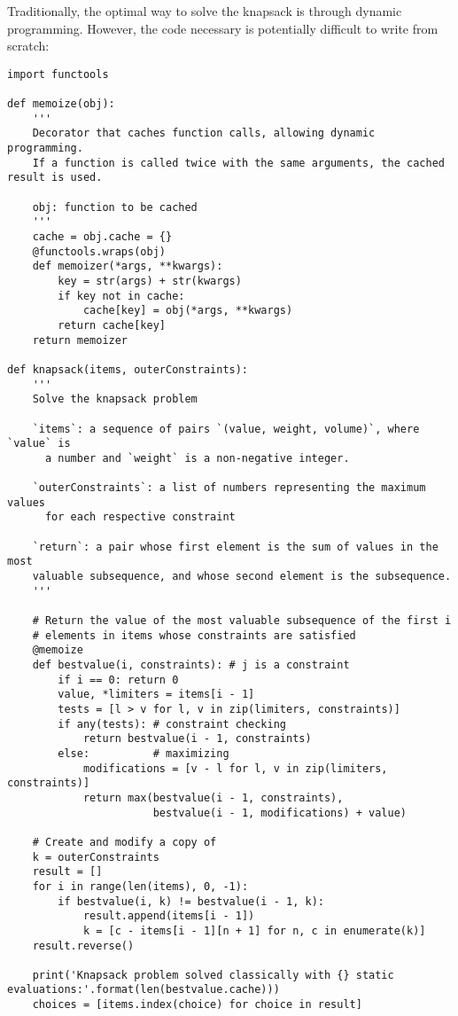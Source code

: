 \documentclass{article}
\begin{document}
Traditionally, the optimal way to solve the knapsack is through dynamic programming.
However, the code necessary is potentially difficult to write from scratch:

\lstset{language=Python}
\begin{lstlisting}
import functools

def memoize(obj):
    '''
    Decorator that caches function calls, allowing dynamic programming.
    If a function is called twice with the same arguments, the cached result is used.

    obj: function to be cached
    '''
    cache = obj.cache = {}
    @functools.wraps(obj)
    def memoizer(*args, **kwargs):
        key = str(args) + str(kwargs)
        if key not in cache:
            cache[key] = obj(*args, **kwargs)
        return cache[key]
    return memoizer

def knapsack(items, outerConstraints):
    '''
    Solve the knapsack problem

    `items`: a sequence of pairs `(value, weight, volume)`, where `value` is
      a number and `weight` is a non-negative integer.

    `outerConstraints`: a list of numbers representing the maximum values 
      for each respective constraint

    `return`: a pair whose first element is the sum of values in the most
    valuable subsequence, and whose second element is the subsequence.
    '''

    # Return the value of the most valuable subsequence of the first i
    # elements in items whose constraints are satisfied
    @memoize
    def bestvalue(i, constraints): # j is a constraint
        if i == 0: return 0
        value, *limiters = items[i - 1]
        tests = [l > v for l, v in zip(limiters, constraints)]
        if any(tests): # constraint checking
            return bestvalue(i - 1, constraints)
        else:          # maximizing
            modifications = [v - l for l, v in zip(limiters, constraints)]
            return max(bestvalue(i - 1, constraints),
                       bestvalue(i - 1, modifications) + value)

    # Create and modify a copy of
    k = outerConstraints
    result = []
    for i in range(len(items), 0, -1):
        if bestvalue(i, k) != bestvalue(i - 1, k):
            result.append(items[i - 1])
            k = [c - items[i - 1][n + 1] for n, c in enumerate(k)]
    result.reverse()

    print('Knapsack problem solved classically with {} static evaluations:'.format(len(bestvalue.cache)))
    choices = [items.index(choice) for choice in result]
\end{lstlisting}
\end{document}
